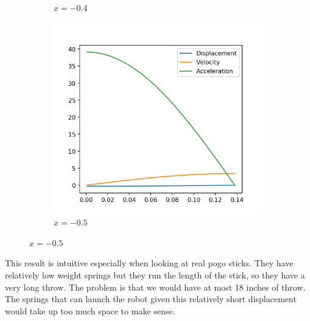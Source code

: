\documentclass[12pt, letterpaper]{article}
\begin{document}
\begin{figure}[h]
\begin{subfigure}[b]{.3\linewidth}
    \caption{$x=-0.4$}
  \end{subfigure}
  \begin{subfigure}[b]{.3\linewidth}
    \includegraphics[width=\linewidth]{Hooke/hooke9000-0_3.png}
    \caption{$x=-0.5$}
  \end{subfigure}
\end{figure}

This result is intuitive especially when looking at real pogo sticks. They have relatively low weight springs
but they run the length of the stick, so they have a very long throw. The problem is that we would have at
most 18 inches of throw. The springs that can launch the robot given this relatively short displacement would
take up too much space to make sense.
\end{document}
